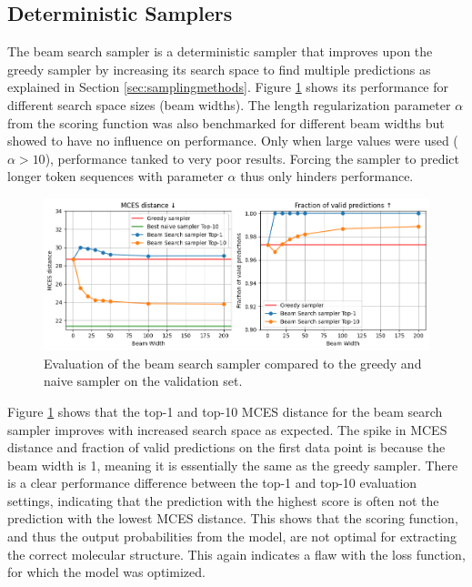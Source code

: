 \subsection{Deterministic Samplers}

The beam search sampler is a deterministic sampler that improves upon the greedy sampler by increasing its search space to find multiple predictions as explained in Section \ref{sec:samplingmethods}.
Figure \ref{fig:beam-search} shows its performance for different search space sizes (beam widths).
The length regularization parameter $\alpha$ from the scoring function was also benchmarked for different beam widths but showed to have no influence on performance.
Only when large values were used ($\alpha > 10$), performance tanked to very poor results.
Forcing the sampler to predict longer token sequences with parameter $\alpha$ thus only hinders performance.

\begin{figure}[h]
    \centering
    \includegraphics[width=1.0\textwidth]{figures/results/samplers/beam_search.png}
    \caption{Evaluation of the beam search sampler compared to the greedy and naive sampler on the validation set.}
    \label{fig:beam-search}
\end{figure}

Figure \ref{fig:beam-search} shows that the top-1 and top-10 MCES distance for the beam search sampler improves with increased search space as expected.
The spike in MCES distance and fraction of valid predictions on the first data point is because the beam width is 1, meaning it is essentially the same as the greedy sampler.
There is a clear performance difference between the top-1 and top-10 evaluation settings, indicating that the prediction with the highest score is often not the prediction with the lowest MCES distance.
This shows that the scoring function, and thus the output probabilities from the model, are not optimal for extracting the correct molecular structure.
This again indicates a flaw with the loss function, for which the model was optimized.

